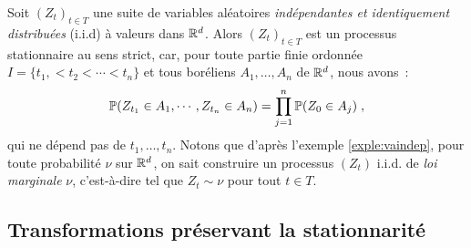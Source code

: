 \begin{example}[Processus i.i.d]
\label{exple:iid}
Soit $(Z_t)_{t\in T}$ une suite de variables al\'eatoires \emph{ind\'ependantes et
  identiquement distribu\'ees} (i.i.d) \`a valeurs dans
$\mathbb{R}^d$. Alors $(Z_t)_{t\in T}$ est
un processus stationnaire au sens strict, car, pour toute partie finie ordonn\'ee
$I = \{ t_1, < t_2 < \cdots < t_n \}$ et tous bor\'eliens $A_1,\dots,A_n$ de
$\mathbb{R}^d$, nous
avons~:
\[
 \mathbb{P} ( Z_{t_1} \in A_1, \cdots, Z_{t_n} \in A_n)
 =
 \prod_{j=1}^n \mathbb{P}(Z_0 \in A_j)\;,
\]
qui ne d\'epend pas de $t_1,\dots,t_n$. Notons que d'apr\`es l'exemple
\ref{exple:vaindep}, pour toute probabilit\'e $\nu$ sur $\mathbb{R}^d$, on
sait construire un processus $(Z_t)$ i.i.d. de \emph{loi marginale} 
$\nu$, c'est-\`a-dire tel que $Z_t\sim \nu$ pour tout $t\in T$.
\end{example}


\subsection{Transformations pr\'eservant la stationnarit\'e}

